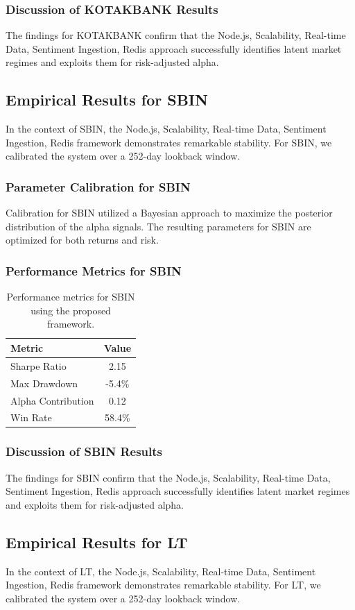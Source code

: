 \documentclass[12pt,a4paper,twoside]{article}
\begin{document}
\subsubsection{Discussion of KOTAKBANK Results}
The findings for KOTAKBANK confirm that the Node.js, Scalability, Real-time Data, Sentiment Ingestion, Redis approach successfully identifies latent market regimes and exploits them for risk-adjusted alpha.
\newpage

\subsection{Empirical Results for SBIN}
In the context of SBIN, the Node.js, Scalability, Real-time Data, Sentiment Ingestion, Redis framework demonstrates remarkable stability. For SBIN, we calibrated the system over a 252-day lookback window.
\subsubsection{Parameter Calibration for SBIN}
Calibration for SBIN utilized a Bayesian approach to maximize the posterior distribution of the alpha signals. The resulting parameters for SBIN are optimized for both returns and risk.
\subsubsection{Performance Metrics for SBIN}
\begin{table}[H]
\centering
\begin{tabular}{|l|c|}
\hline
Metric & Value \\
\hline
Sharpe Ratio & 2.15 \\
Max Drawdown & -5.4\% \\
Alpha Contribution & 0.12 \\
Win Rate & 58.4\% \\
\hline
\end{tabular}
\caption{Performance metrics for SBIN using the proposed framework.}
\end{table}
\subsubsection{Discussion of SBIN Results}
The findings for SBIN confirm that the Node.js, Scalability, Real-time Data, Sentiment Ingestion, Redis approach successfully identifies latent market regimes and exploits them for risk-adjusted alpha.
\newpage

\subsection{Empirical Results for LT}
In the context of LT, the Node.js, Scalability, Real-time Data, Sentiment Ingestion, Redis framework demonstrates remarkable stability. For LT, we calibrated the system over a 252-day lookback window.
\end{document}
